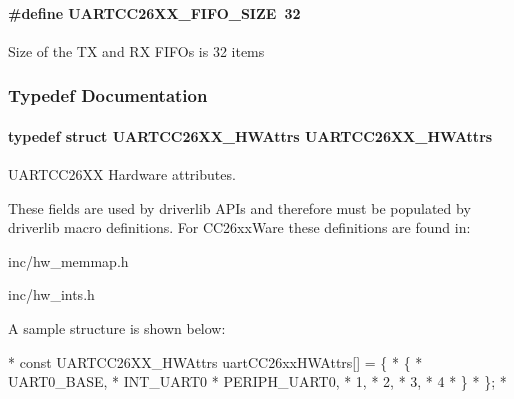 \paragraph[{U\-A\-R\-T\-C\-C26\-X\-X\-\_\-\-F\-I\-F\-O\-\_\-\-S\-I\-Z\-E}]{\setlength{\rightskip}{0pt plus 5cm}\#define U\-A\-R\-T\-C\-C26\-X\-X\-\_\-\-F\-I\-F\-O\-\_\-\-S\-I\-Z\-E~32}\label{_u_a_r_t_c_c26_x_x_8h_aa3cbdad922e595319c76870add0d41e6}
Size of the T\-X and R\-X F\-I\-F\-Os is 32 items 

\subsubsection{Typedef Documentation}
\paragraph[{U\-A\-R\-T\-C\-C26\-X\-X\-\_\-\-H\-W\-Attrs}]{\setlength{\rightskip}{0pt plus 5cm}typedef struct {\bf U\-A\-R\-T\-C\-C26\-X\-X\-\_\-\-H\-W\-Attrs}  {\bf U\-A\-R\-T\-C\-C26\-X\-X\-\_\-\-H\-W\-Attrs}}\label{_u_a_r_t_c_c26_x_x_8h_a779ad8f4640de879a0cdf41f4274206d}


U\-A\-R\-T\-C\-C26\-X\-X Hardware attributes. 

These fields are used by driverlib A\-P\-Is and therefore must be populated by driverlib macro definitions. For C\-C26xx\-Ware these definitions are found in\-:
\begin{DoxyItemize}
\item inc/hw\-\_\-memmap.\-h
\item inc/hw\-\_\-ints.\-h
\end{DoxyItemize}

A sample structure is shown below\-: 
\begin{DoxyCode}
*  \textcolor{keyword}{const} UARTCC26XX_HWAttrs uartCC26xxHWAttrs[] = \{
*      \{
*          UART0\_BASE,
*          INT\_UART0
*          PERIPH\_UART0,
*          1,
*          2,
*          3,
*          4
*      \}
*  \};
*  
\end{DoxyCode}
